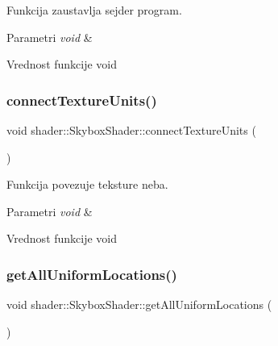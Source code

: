 Funkcija zaustavlja sejder program. 


\begin{DoxyParams}{Parametri}
{\em void} & \\
\hline
\end{DoxyParams}
\begin{DoxyReturn}{Vrednost funkcije}
void 
\end{DoxyReturn}
\mbox{\label{classshader_1_1SkyboxShader_a0ec32687208276708275f34f589c5b44}} 
\subsubsection{\texorpdfstring{connect\+Texture\+Units()}{connectTextureUnits()}}
{\footnotesize\ttfamily void shader\+::\+Skybox\+Shader\+::connect\+Texture\+Units (\begin{DoxyParamCaption}{ }\end{DoxyParamCaption})}



Funkcija povezuje teksture neba. 


\begin{DoxyParams}{Parametri}
{\em void} & \\
\hline
\end{DoxyParams}
\begin{DoxyReturn}{Vrednost funkcije}
void 
\end{DoxyReturn}
\mbox{\label{classshader_1_1SkyboxShader_a1add7258c2e59462e6214d904a5a4256}} 
\subsubsection{\texorpdfstring{get\+All\+Uniform\+Locations()}{getAllUniformLocations()}}
{\footnotesize\ttfamily void shader\+::\+Skybox\+Shader\+::get\+All\+Uniform\+Locations (\begin{DoxyParamCaption}\item[{void}]{ }\end{DoxyParamCaption})}



